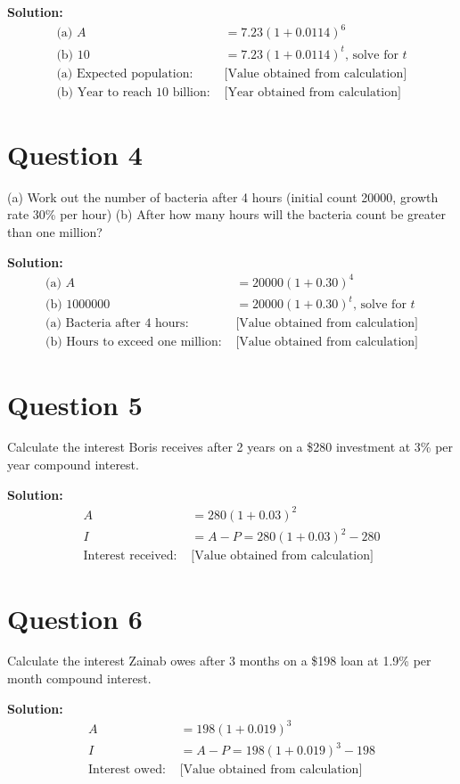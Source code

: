 \documentclass{article}
\begin{document}
\textbf{Solution:}
\begin{align*}
\text{(a) } A &= 7.23(1 + 0.0114)^6 \\
\text{(b) } 10 &= 7.23(1 + 0.0114)^t \text{, solve for } t \\
\text{(a) Expected population: } & \text{[Value obtained from calculation]} \\
\text{(b) Year to reach 10 billion: } & \text{[Year obtained from calculation]}
\end{align*}

\section*{Question 4}
(a) Work out the number of bacteria after 4 hours (initial count 20000, growth rate 30\% per hour)
(b) After how many hours will the bacteria count be greater than one million?

\textbf{Solution:}
\begin{align*}
\text{(a) } A &= 20000(1 + 0.30)^4 \\
\text{(b) } 1000000 &= 20000(1 + 0.30)^t \text{, solve for } t \\
\text{(a) Bacteria after 4 hours: } & \text{[Value obtained from calculation]} \\
\text{(b) Hours to exceed one million: } & \text{[Value obtained from calculation]}
\end{align*}

\section*{Question 5}
Calculate the interest Boris receives after 2 years on a \$280 investment at 3\% per year compound interest.

\textbf{Solution:}
\begin{align*}
A &= 280(1 + 0.03)^2 \\
I &= A - P = 280(1 + 0.03)^2 - 280 \\
\text{Interest received: } & \text{[Value obtained from calculation]}
\end{align*}

\section*{Question 6}
Calculate the interest Zainab owes after 3 months on a \$198 loan at 1.9\% per month compound interest.

\textbf{Solution:}
\begin{align*}
A &= 198(1 + 0.019)^3 \\
I &= A - P = 198(1 + 0.019)^3 - 198 \\
\text{Interest owed: } & \text{[Value obtained from calculation]}
\end{align*}
\end{document}
